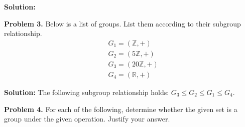 \documentclass[12pt, letterpaper]{article}
\newenvironment{problem}
    [1]
    {\noindent \textbf{Problem #1.}}
    {\vspace{3mm}}
\newenvironment{solution}
    [0]
    {\noindent \textbf{Solution:}} 
    {\vspace{3mm}}
\begin{document}
\begin{solution}
    \vspace{250mm}
\end{solution}

\begin{problem}{3}
    Below is a list of groups. List them according to their subgroup relationship.
    \begin{align*}
        &G_1 = (\mathbb{Z}, +)\\
        &G_2 = (5\mathbb{Z}, +)\\
        &G_3 = (20\mathbb{Z}, +)\\
        &G_4 = (\mathbb{R}, +)
    \end{align*}
\end{problem}

\begin{solution}
    The following subgroup relationship holds: $G_3 \leq G_2 \leq G_1 \leq G_4$.
\end{solution}

\begin{problem}{4}
    For each of the following, determine whether the given set is a group under the 
    given operation. Justify your answer.
\end{problem}
\end{document}
